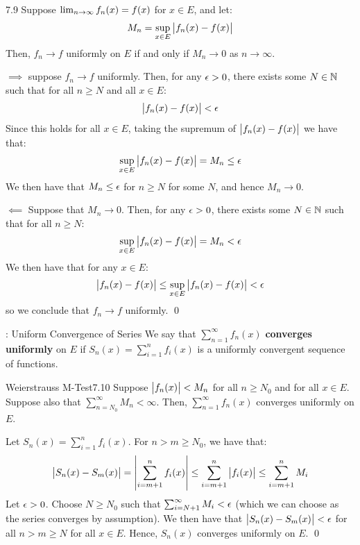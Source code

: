 \begin{theorem}{}{7.9}
    Suppose $\lim_{n \rightarrow \infty} f_n(x) = f(x)$ for $x \in E$, and let:
    \begin{align*}
        M_n = \sup_{x \in E}\abs{f_n(x) - f(x)}
    \end{align*}
    Then, $f_n \rightarrow f$ uniformly on $E$ if and only if $M_n \rightarrow 0$ as $n \rightarrow \infty$.
\end{theorem}
\begin{nproof}
    $\boxed{\implies}$ suppose $f_n \rightarrow f$ uniformly. Then, for any $\epsilon > 0$, there exists some $N \in \mathbb{N}$ such that for all $n \geq N$ and all $x \in E$:
    \begin{align*}
        \abs{f_n(x) - f(x)} < \epsilon
    \end{align*}
    Since this holds for all $x \in E$, taking the supremum of $\abs{f_n(x) - f(x)}$ we have that:
    \begin{align*}
        \sup_{x \in E}\abs{f_n(x) - f(x)} = M_n \leq \epsilon
    \end{align*}
    We then have that $M_n \leq \epsilon$ for $n \geq N$ for some $N$, and hence $M_n \rightarrow 0$.
    
    $\boxed{\impliedby}$ Suppose that $M_n \rightarrow 0$. Then, for any $\epsilon > 0$, there exists some $N \in \mathbb{N}$ such that for all $n \geq N$:
    \begin{align*}
        \sup_{x \in E}\abs{f_n(x) - f(x)} = M_n < \epsilon
    \end{align*}
    We then have that for any $x \in E$:
    \begin{align*}
        \abs{f_n(x) - f(x)} \leq \sup_{x \in E}\abs{f_n(x) - f(x)} < \epsilon
    \end{align*}
    so we conclude that $f_n \rightarrow f$ uniformly. \qed
\end{nproof}

\begin{ndef}{: Uniform Convergence of Series}{}
    We say that $\sum_{n = 1}^\infty f_n(x)$ \textbf{converges uniformly} on $E$ if $S_n(x) = \sum_{i=1}^n f_i(x)$ is a uniformly convergent sequence of functions.
\end{ndef}

\begin{theorem}{Weierstrauss M-Test}{7.10}
    Suppose $\abs{f_n(x)} < M_n$ for all $n \geq N_0$ and for all $x \in E$. Suppose also that $\sum_{n = N_0}^\infty M_n < \infty$. Then, $\sum_{n=1}^\infty f_n(x)$ converges uniformly on $E$. 
\end{theorem}
\begin{nproof}
    Let $S_n(x) = \sum_{i=1}^n f_i(x)$. For $n > m \geq N_0$, we have that:
    \begin{align*}
        \abs{S_n(x) - S_m(x)} = \abs{\sum_{i=m+1}^n f_i(x)} \leq \sum_{i=m+1}^n \abs{f_i(x)} \leq \sum_{i=m+1}^n M_i
    \end{align*}
    Let $\epsilon > 0$. Choose $N \geq N_0$ such that $\sum_{i = N+1}^\infty M_i < \epsilon$ (which we can choose as the series converges by assumption). We then have that $\abs{S_n(x) - S_m(x)} < \epsilon$ for all $n > m \geq N$ for all $x \in E$. Hence, $S_n(x)$ converges uniformly on $E$. \qed
\end{nproof}


